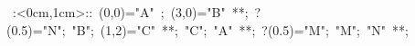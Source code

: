 %

\hbox{
\xy    <1cm,0cm>:<0cm,1cm>::
       (0,0)="A" ; (3,0)="B" **\dir{-}; ?(0.5)="N";
       "B"; (1,2)="C" **\dir{-};  "C"; 
       "A" **\dir{-}; ?(0.5)="M"; "M"; "N" **\dir{-};
       \endxy}
	   
